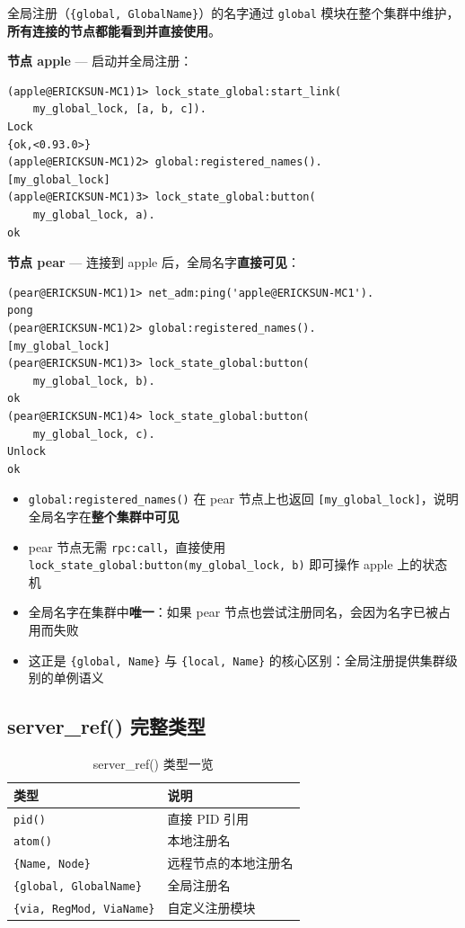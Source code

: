 \documentclass[a4paper,11pt]{article}
\begin{document}
全局注册（\texttt{\{global, GlobalName\}}）的名字通过 \texttt{global} 模块在整个集群中维护，\textbf{所有连接的节点都能看到并直接使用}。

\textbf{节点 apple} --- 启动并全局注册：

\begin{lstlisting}[style=shellstyle, caption={apple 节点 --- 全局注册 gen\_statem}]
(apple@ERICKSUN-MC1)1> lock_state_global:start_link(
    my_global_lock, [a, b, c]).
Lock
{ok,<0.93.0>}
(apple@ERICKSUN-MC1)2> global:registered_names().
[my_global_lock]
(apple@ERICKSUN-MC1)3> lock_state_global:button(
    my_global_lock, a).
ok
\end{lstlisting}

\textbf{节点 pear} --- 连接到 apple 后，全局名字\textbf{直接可见}：

\begin{lstlisting}[style=shellstyle, caption={pear 节点 --- 直接通过全局名字访问}]
(pear@ERICKSUN-MC1)1> net_adm:ping('apple@ERICKSUN-MC1').
pong
(pear@ERICKSUN-MC1)2> global:registered_names().
[my_global_lock]
(pear@ERICKSUN-MC1)3> lock_state_global:button(
    my_global_lock, b).
ok
(pear@ERICKSUN-MC1)4> lock_state_global:button(
    my_global_lock, c).
Unlock
ok
\end{lstlisting}

\begin{tipbox}[全局注册的关键特性]
\begin{itemize}[leftmargin=1.5em]
    \item \texttt{global:registered\_names()} 在 pear 节点上也返回 \texttt{[my\_global\_lock]}，说明全局名字在\textbf{整个集群中可见}
    \item pear 节点无需 \texttt{rpc:call}，直接使用 \texttt{lock\_state\_global:button(my\_global\_lock, b)} 即可操作 apple 上的状态机
    \item 全局名字在集群中\textbf{唯一}：如果 pear 节点也尝试注册同名，会因为名字已被占用而失败
    \item 这正是 \texttt{\{global, Name\}} 与 \texttt{\{local, Name\}} 的核心区别：全局注册提供集群级别的单例语义
\end{itemize}
\end{tipbox}

\subsection{server\_ref() 完整类型}

\begin{table}[H]
\centering
\begin{tabular}{@{}ll@{}}
\toprule
\textbf{类型} & \textbf{说明} \\
\midrule
\texttt{pid()} & 直接 PID 引用 \\
\texttt{atom()} & 本地注册名 \\
\texttt{\{Name, Node\}} & 远程节点的本地注册名 \\
\texttt{\{global, GlobalName\}} & 全局注册名 \\
\texttt{\{via, RegMod, ViaName\}} & 自定义注册模块 \\
\bottomrule
\end{tabular}
\caption{server\_ref() 类型一览}
\end{table}
\end{document}
